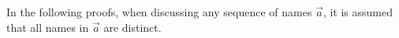 %




In the following proofs, when discussing any sequence of names $\vec a$, it is assumed that all names in $\vec a$ are distinct.


